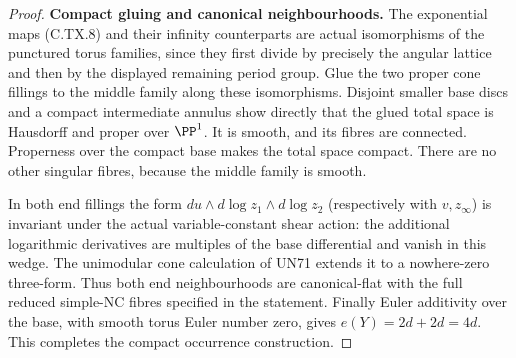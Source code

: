 \begin{proof}
\par\medskip\noindent\textbf{Compact gluing and canonical neighbourhoods.}
The exponential maps (C.TX.8) and
their infinity counterparts are
actual isomorphisms of the
punctured torus families, since
they first divide by precisely
the angular lattice and then
by the displayed remaining
period group. Glue the two
proper cone fillings to the
middle family along these
isomorphisms. Disjoint smaller
base discs and a compact
intermediate annulus show
directly that the glued total
space is Hausdorff and proper
over $\PP^1$. It is smooth,
and its fibres are connected.
Properness over the compact
base makes the total space
compact. There are no other
singular fibres, because the
middle family is smooth.

In both end fillings the form
$du\wedge d\log z_1\wedge d\log z_2$
(respectively with $v,z_\infty$)
is invariant under the actual
variable-constant shear action:
the additional logarithmic
derivatives are multiples of
the base differential and
vanish in this wedge. The
unimodular cone calculation
of UN71 extends it to a
nowhere-zero three-form.
Thus both end neighbourhoods
are canonical-flat with the
full reduced simple-NC
fibres specified in the
statement. Finally Euler
additivity over the base,
with smooth torus Euler
number zero, gives
$e(Y)=2d+2d=4d$.
This completes the compact
occurrence construction.
\end{proof}
